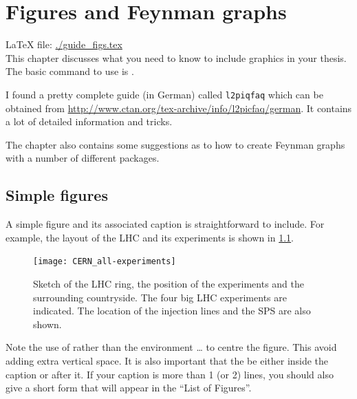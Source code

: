 
\chapter{Figures and Feynman graphs}%
\label{sec:fig}

\LaTeX{} file: \url{./guide_figs.tex}\\[1ex]
\noindent
This chapter discusses what you need to know to include graphics in
your thesis. The basic command to use is .

I found a pretty complete guide (in German) called \texttt{l2piqfaq}
which can be obtained from
\url{http://www.ctan.org/tex-archive/info/l2picfaq/german}. It contains
a lot of detailed information and tricks.

The chapter also contains some suggestions as to how to create Feynman
graphs with a number of different packages.

\section{Simple figures}%
\label{sec:fig:simple}

A simple figure and its associated caption is straightforward to
include. For example, the layout of the LHC and its experiments is
shown in \cref{fig:LHC}.

\begin{figure}[htbp]
  \centering
  \texttt{[image: CERN\_all-experiments]}
  \caption[Sketch of the LHC ring, the position of the experiments and
  the surrounding countryside.]{Sketch of the LHC ring, the position
    of the experiments and the surrounding countryside. The four big
    LHC experiments are indicated. The location of the injection lines
    and the SPS are also shown.}%
  \label{fig:LHC}
\end{figure}

Note the use of  rather than the environment
 \ldots {} to centre the figure. This
avoid adding extra vertical space. It is also important that the
 be either inside the caption or after it. If your
caption is more than 1 (or 2) lines, you should also give a short form
that will appear in the ``List of Figures''.

